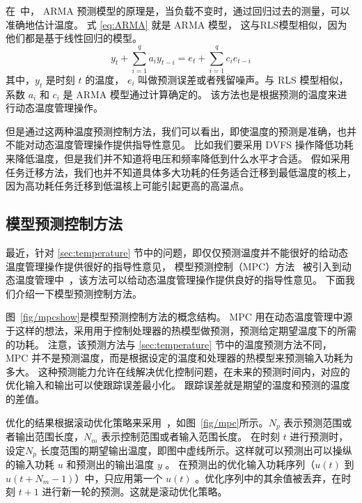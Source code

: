 在~\cite{coskun2008proactive}中，  ARMA 预测模型的原理是，当负载不变时，通过回归过去的测量，可以准确地估计温度。
式  \eqref{eq:ARMA} 就是 ARMA 模型， 这与RLS模型相似，因为他们都是基于线性回归的模型。
\begin{equation}\label{eq:ARMA}
y_t + \sum_{i=1}^qa_iy_{t-i} = e_t +\sum_{i=1}^qc_ie_{t-i}
\end{equation}
其中，$y_t$ 是时刻 $t$ 的温度， $e_i$ 叫做预测误差或者残留噪声。与 RLS 模型相似，系数 $a_i$ 和 $c_i$ 是 ARMA 模型通过计算确定的。
该方法也是根据预测的温度来进行动态温度管理操作。

但是通过这两种温度预测控制方法，我们可以看出，即使温度的预测是准确，也并不能对动态温度管理操作提供指导性意见。
比如我们要采用 DVFS 操作降低功耗来降低温度，但是我们并不知道将电压和频率降低到什么水平才合适。 
假如采用任务迁移方法，我们也并不知道具体多大功耗的任务适合迁移到最低温度的核上，因为高功耗任务迁移到低温核上可能引起更高的高温点。

\subsection{模型预测控制方法}\label{sec:mpc}

最近，针对 \ref{sec:temperature} 节中的问题，即仅仅预测温度并不能很好的给动态温度管理操作提供很好的指导性意见，
模型预测控制（MPC）方法~ 被引入到动态温度管理中~，该方法可以给动态温度管理操作提供良好的指导性意见。
下面我们介绍一下模型预测控制方法。

图~\ref{fig/mpcshow}是模型预测控制方法的概念结构。 MPC 用在动态温度管理中源于这样的想法，采用用于控制处理器的热模型做预测，预测给定期望温度下的所需的功耗。
注意，该预测方法与 \ref{sec:temperature} 节中的温度预测方法不同， MPC 并不是预测温度，而是根据设定的温度和处理器的热模型来预测输入功耗为多大。
这种预测能力允许在线解决优化控制问题，在未来的预测时间内，对应的优化输入和输出可以使跟踪误差最小化。 跟踪误差就是期望的温度和预测的温度的差值。

优化的结果根据滚动优化策略来采用~，如图~\ref{fig/mpc}所示。$N_p$ 表示预测范围或者输出范围长度，$N_m$ 表示控制范围或者输入范围长度。
在时刻 $t$ 进行预测时，设定$N_p$ 长度范围的期望输出温度，即图中虚线所示。这样就可以预测出可以操纵的输入功耗 $u$ 和预测出的输出温度 $y$ 。
在预测出的优化输入功耗序列（$ u(t) $ 到 $ u(t+N_m-1) $）中，只应用第一个 $ u(t)$ 。优化序列中的其余值被丢弃，在时刻 $t+1$ 进行新一轮的预测。这就是滚动优化策略。 



